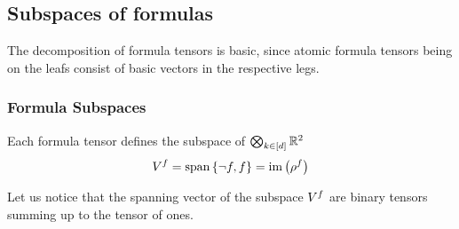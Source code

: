 %
%
%
%
%
%
%
%






\subsection{Subspaces of formulas}\label{sec:HT}

The decomposition of formula tensors is basic, since atomic formula tensors being on the leafs consist of basic vectors in the respective legs.


\subsubsection{Formula Subspaces}

Each formula tensor defines the subspace of $\bigotimes_{k\in[d]}\mathbb{R}^2$
\begin{align}
	V^{f} = \mathrm{span} \left\{ \lnot f,f \right\} = \mathrm{im}\left(\rho^{f} \right)
\end{align}

Let us notice that the spanning vector of the subspace $V^{f}$ are binary tensors summing up to the tensor of ones.



